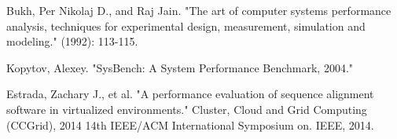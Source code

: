 \documentclass[11pt]{article}
\begin{document}
\begin{thebibliography}{99}
	Bukh, Per Nikolaj D., and Raj Jain. "The art of computer systems performance analysis, techniques for experimental design, measurement, simulation and modeling." (1992): 113-115.
	
	Kopytov, Alexey. "SysBench: A System Performance Benchmark, 2004."
	
	Estrada, Zachary J., et al. "A performance evaluation of sequence alignment software in virtualized environments." Cluster, Cloud and Grid Computing (CCGrid), 2014 14th IEEE/ACM International Symposium on. IEEE, 2014.
	 
\end{thebibliography}
\end{document}
